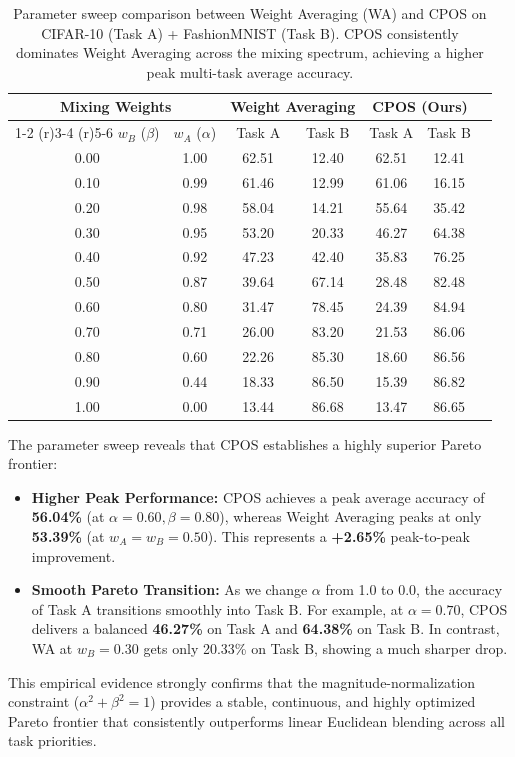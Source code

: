 \documentclass{article}
\theoremstyle{plain}
\theoremstyle{definition}
\theoremstyle{remark}
\begin{document}
\begin{table}[h]
\caption{Parameter sweep comparison between Weight Averaging (WA) and CPOS on CIFAR-10 (Task A) + FashionMNIST (Task B). CPOS consistently dominates Weight Averaging across the mixing spectrum, achieving a higher peak multi-task average accuracy.}
\label{tab:parameter_sweep}
\begin{center}
\begin{small}
\begin{sc}
\begin{tabular}{ccccccc}
\toprule
\multicolumn{2}{c}{Mixing Weights} & \multicolumn{2}{c}{Weight Averaging} & \multicolumn{2}{c}{CPOS (Ours)} \\
\cmidrule(r){1-2} \cmidrule(r){3-4} \cmidrule(r){5-6}
$w_B$ ($\beta$) & $w_A$ ($\alpha$) & Task A & Task B & Task A & Task B \\
\midrule
0.00 & 1.00 & 62.51 & 12.40 & 62.51 & 12.41 \\
0.10 & 0.99 & 61.46 & 12.99 & 61.06 & 16.15 \\
0.20 & 0.98 & 58.04 & 14.21 & 55.64 & 35.42 \\
0.30 & 0.95 & 53.20 & 20.33 & 46.27 & 64.38 \\
0.40 & 0.92 & 47.23 & 42.40 & 35.83 & 76.25 \\
0.50 & 0.87 & 39.64 & 67.14 & 28.48 & 82.48 \\
0.60 & 0.80 & 31.47 & 78.45 & 24.39 & 84.94 \\
0.70 & 0.71 & 26.00 & 83.20 & 21.53 & 86.06 \\
0.80 & 0.60 & 22.26 & 85.30 & 18.60 & 86.56 \\
0.90 & 0.44 & 18.33 & 86.50 & 15.39 & 86.82 \\
1.00 & 0.00 & 13.44 & 86.68 & 13.47 & 86.65 \\
\bottomrule
\end{tabular}
\end{sc}
\end{small}
\end{center}
\end{table}

The parameter sweep reveals that CPOS establishes a highly superior Pareto frontier:
\begin{itemize}
\item \textbf{Higher Peak Performance:} CPOS achieves a peak average accuracy of \textbf{56.04\%} (at $\alpha = 0.60, \beta = 0.80$), whereas Weight Averaging peaks at only \textbf{53.39\%} (at $w_A = w_B = 0.50$). This represents a \textbf{+2.65\%} peak-to-peak improvement.
\item \textbf{Smooth Pareto Transition:} As we change $\alpha$ from 1.0 to 0.0, the accuracy of Task A transitions smoothly into Task B. For example, at $\alpha = 0.70$, CPOS delivers a balanced \textbf{46.27\%} on Task A and \textbf{64.38\%} on Task B. In contrast, WA at $w_B = 0.30$ gets only 20.33\% on Task B, showing a much sharper drop.
\end{itemize}
This empirical evidence strongly confirms that the magnitude-normalization constraint ($\alpha^2 + \beta^2 = 1$) provides a stable, continuous, and highly optimized Pareto frontier that consistently outperforms linear Euclidean blending across all task priorities.
\end{document}
